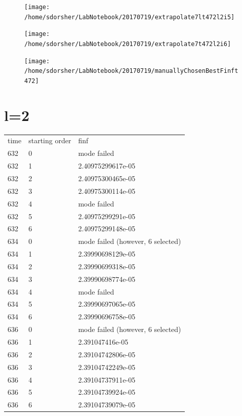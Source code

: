 \documentclass{article}
\begin{document}
\begin{figure}
  \texttt{[image: /home/sdorsher/LabNotebook/20170719/extrapolate7lt472l2i5]}
\end{figure}

\begin{figure}
  \texttt{[image: /home/sdorsher/LabNotebook/20170719/extrapolate7t472l2i6]}
\end{figure}

\begin{figure}
  \texttt{[image: /home/sdorsher/LabNotebook/20170719/manuallyChosenBestFinft472]}
\end{figure}









\section{l=2}
\begin{table}
  \begin{tabular}{lll}
    time & starting order & finf\\
    632 & 0 & mode failed\\
    632 & 1 & 2.40975299617e-05\\
    632 & 2 & 2.40975300465e-05\\
    632 & 3 & 2.40975300114e-05\\
    632 & 4 & mode failed\\
    632 & 5 & 2.40975299291e-05\\
    632 & 6 & 2.40975299148e-05\\
    \hline
    634 & 0 & mode failed (however, 6 selected)\\
    634 & 1 & 2.39990698129e-05\\
    634 & 2 & 2.39990699318e-05\\
    634 & 3 & 2.39990698774e-05\\
    634 & 4 & mode failed\\
    634 & 5 & 2.39990697065e-05\\
    634 & 6 & 2.39990696758e-05\\
    \hline
    636 & 0 & mode failed (however, 6 selected)\\
    636 & 1 & 2.391047416e-05\\
    636 & 2 & 2.39104742806e-05\\
    636 & 3 & 2.39104742249e-05\\
    636 & 4 & 2.39104737911e-05\\
    636 & 5 & 2.39104739924e-05\\
    636 & 6 & 2.39104739079e-05\\
  \end{tabular}
\end{table}
\end{document}
